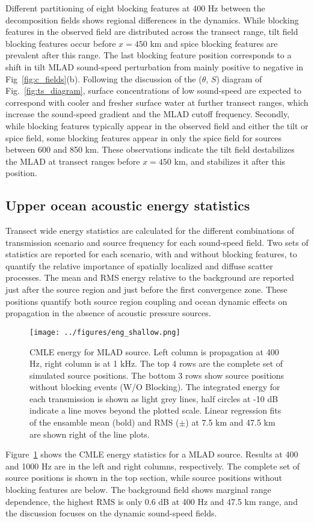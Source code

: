 \documentclass[preprint,NumberedRefs]{JASA}
\begin{document}
Different partitioning of eight blocking features at 400 Hz between the decomposition fields shows regional differences in the dynamics. While blocking features in the observed field are distributed across the transect range, tilt field blocking features occur before $x=450$ km and spice blocking features are prevalent after this range. The last blocking feature position corresponds to a shift in tilt MLAD sound-speed perturbation from mainly positive to negative in Fig~\ref{fig:c_fields}(b). Following the discussion of the ($\theta$, $S$) diagram of Fig.~\ref{fig:ts_diagram}, surface concentrations of low sound-speed are expected to correspond with cooler and fresher surface water at further transect ranges, which increase the sound-speed gradient and the MLAD cutoff frequency. Secondly, while blocking features typically appear in the observed field and either the tilt or spice field, some blocking features appear in only the spice field for sources between 600 and 850 km. These observations indicate the tilt field destabilizes the MLAD at transect ranges before $x=450$ km, and stabilizes it after this position.

\subsection{Upper ocean acoustic energy statistics}\label{ssec:energy}
Transect wide energy statistics are calculated for the different combinations of transmission scenario and source frequency for each sound-speed field. Two sets of statistics are reported for each scenario, with and without blocking features, to quantify the relative importance of spatially localized and diffuse scatter processes. The mean and RMS energy relative to the background are reported just after the source region and just before the first convergence zone. These positions quantify both source region coupling and ocean dynamic effects on propagation in the absence of acoustic pressure sources.

\begin{figure}
\texttt{[image: ../figures/eng\_shallow.png]}
    \caption{CMLE energy for MLAD source. Left column is propagation at 400 Hz, right column is at 1 kHz. The top 4 rows are the complete set of simulated source positions. The bottom 3 rows show source positions without blocking events (W/O Blocking). The integrated energy for each transmission is shown as light grey lines, half circles at -10 dB indicate a line moves beyond the plotted scale. Linear regression fits of the ensamble mean (bold) and RMS ($\pm$) at 7.5 km and 47.5 km are shown right of the line plots.}
    \label{fig:shal_eng}
\end{figure}
Figure~\ref{fig:shal_eng} shows the CMLE energy statistics for a MLAD source. Results at 400 and 1000 Hz are in the left and right columns, respectively. The complete set of source positions is shown in the top section, while source positions without blocking features are below. The background field shows marginal range dependence, the highest RMS is only 0.6 dB at 400 Hz and 47.5 km range, and the discussion focuses on the dynamic sound-speed fields.
\end{document}
